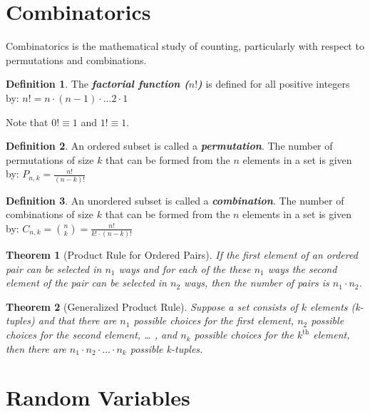 \documentclass[
]{book}
\newtheorem{theorem}{Theorem}[chapter]
\theoremstyle{definition}
\newtheorem{definition}{Definition}[chapter]
\theoremstyle{definition}
\theoremstyle{definition}
\theoremstyle{definition}
\theoremstyle{remark}
\begin{document}
\hypertarget{combinatorics}{%
\section{Combinatorics}\label{combinatorics}}

Combinatorics is the mathematical study of counting, particularly with respect to permutations and combinations.

\begin{definition}
The \textbf{\emph{factorial function (\(n!\))}} is defined for all positive integers by: \(n! = n \cdot (n-1) \cdot \ldots 2 \cdot 1\)
\end{definition}

Note that \(0! \equiv 1\) and \(1! \equiv 1\).

\begin{definition}
An ordered subset is called a \textbf{\emph{permutation}}. The number of permutations of size \(k\) that can be formed from the \(n\) elements in a set is given by: \(P_{n,k} = \frac{n!}{(n-k)!}\)
\end{definition}

\begin{definition}
An unordered subset is called a \textbf{\emph{combination}}. The number of combinations of size \(k\) that can be formed from the \(n\) elements in a set is given by: \(C_{n,k} = {n \choose k} = \frac{n!}{k! \cdot (n-k)!}\)
\end{definition}

\begin{theorem}[Product Rule for Ordered Pairs]
If the first element of an ordered pair can be selected in \(n_1\) ways and for each of the these \(n_1\) ways the second element of the pair can be selected in \(n_2\) ways, then the number of pairs is \(n_1 \cdot n_2\).
\end{theorem}

\begin{theorem}[Generalized Product Rule]
Suppose a set consists of \(k\) elements (k-tuples) and that there are \(n_1\) possible choices for the first element, \(n_2\) possible choices for the second element, \ldots{} , and \(n_k\) possible choices for the \(k^\text{th}\) element, then there are \(n_1 \cdot n_2 \cdot \ldots \cdot n_k\) possible k-tuples.
\end{theorem}

\hypertarget{random-variables}{%
\section{Random Variables}\label{random-variables}}
\end{document}
